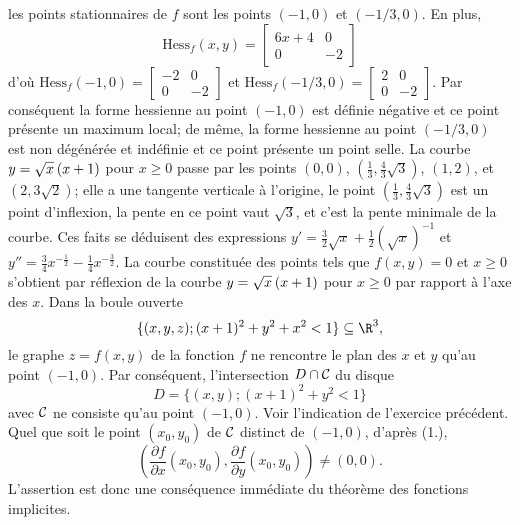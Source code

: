 {\begin{enumerate}
{les points stationnaires de $f$ sont les points
$(-1,0)$ et $(-1/3,0)$.
En plus,
\[
\mathrm{Hess}_f(x,y)=\left[\begin{matrix} 
6x+4 & 0\\  0 & -2
\end{matrix}\right]
\] 
d'o\`u
$\mathrm{Hess}_f(-1,0)= \left[\begin{matrix} 
-2 &  0\\  0 & -2
\end{matrix}\right]$
et
$\mathrm{Hess}_f(-1/3,0)= \left[\begin{matrix} 
2 &  0\\  0 & -2
\end{matrix}\right]$.
Par cons\'equent la forme hessienne au point $(-1,0)$
est d\'efinie n\'egative et ce point pr\'esente  un maximum local;
de m\^eme, la forme hessienne au point $(-1/3,0)$
est non d\'eg\'en\'er\'ee  et ind\'efinie 
et ce point pr\'esente  un point selle.
La courbe $y= \sqrt{x} \hskip 2pt (x+1)$ pour $x\geq 0$
passe par les points $(0,0)$, $(\tfrac 13,\tfrac 43 \sqrt 3)$, 
$(1,2)$, et $(2,3 \sqrt 2)$;
elle a une tangente verticale \`a l'origine,
le point $(\tfrac 13,\tfrac 43 \sqrt 3)$
est un point d'inflexion, la pente en ce point vaut $\sqrt 3$,
et c'est la pente minimale de la courbe.
Ces faits se d\'eduisent
des expressions
$y'= \tfrac 32 \sqrt x + \tfrac 12 (\sqrt x)^{-1}$ et
$y''= \tfrac 34 x^{-\tfrac 12} - \tfrac 14 x^{-\tfrac 32}$.
La courbe constitu\'ee des points tels que $f(x,y)=0$ et $x \geq 0$
s'obtient par r\'eflexion de la courbe
$y= \sqrt{x} \hskip 2pt (x+1)$ pour $x\geq 0$
par rapport \`a l'axe des $x$.
Dans la boule ouverte 
\[
\{(x,y,z);(x+1)^2+y^2+x^2 <1\} \subseteq \R^3, 
\]
le graphe
$z=f(x,y)$ de la fonction $f$ ne rencontre le plan des $x$ et $y$ qu'au point
$(-1,0)$. Par cons\'equent, l'intersection 
$D \cap \cal C$ du disque
\[
D=\{(x,y); (x+1)^2+y^2<1\}
\]
avec $\cal C$ ne consiste qu'au point $(-1,0)$.
Voir l'indication de l'exercice pr\'ec\'edent.
Quel que soit le point 
$(x_0,y_0)$ de ${\cal C}$
distinct de  $(-1,0)$,
d'apr\`es (1.),
\[
\left(\frac{\partial f}{\partial x}(x_0,y_0),\frac{\partial f}{\partial y}(x_0,y_0) \right) 
\ne (0,0).
\] 
L'assertion est donc une cons\'equence imm\'ediate du th\'eor\`eme des 
fonctions implicites.
}
\end{enumerate}
}
